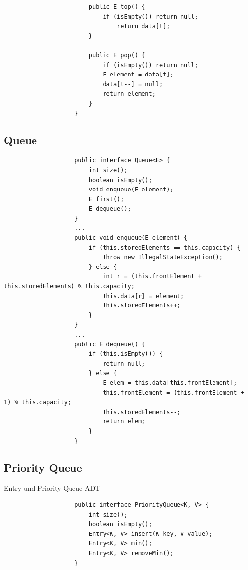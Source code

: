 \documentclass[a4paper, landscape, 8pt]{scrartcl}
\begin{document}
\begin{multicols*}{4}
\begin{lstlisting}
                        public E top() {
                            if (isEmpty()) return null;
                                return data[t];
                        }

                        public E pop() {
                            if (isEmpty()) return null;
                            E element = data[t];
                            data[t--] = null;
                            return element;
                        }
                    }
            \end{lstlisting}

            \subsection{Queue}
                \begin{lstlisting}
                    public interface Queue<E> {
                        int size();
                        boolean isEmpty();
                        void enqueue(E element);
                        E first();
                        E dequeue();
                    }
                    ...
                    public void enqueue(E element) {
                        if (this.storedElements == this.capacity) {
                            throw new IllegalStateException();
                        } else {
                            int r = (this.frontElement + this.storedElements) % this.capacity;
                            this.data[r] = element;
                            this.storedElements++;
                        }
                    }
                    ...
                    public E dequeue() {
                        if (this.isEmpty()) {
                            return null;
                        } else {
                            E elem = this.data[this.frontElement];
                            this.frontElement = (this.frontElement + 1) % this.capacity;
                            this.storedElements--;
                            return elem;
                        }
                    }
                \end{lstlisting}


            \subsection{Priority Queue}
                \textcolor{subsectioncolor}{Entry und Priority Queue ADT}
                \begin{lstlisting}
                    public interface PriorityQueue<K, V> {
                        int size();
                        boolean isEmpty();
                        Entry<K, V> insert(K key, V value);
                        Entry<K, V> min();
                        Entry<K, V> removeMin();
                    }


\end{lstlisting}
\end{multicols*}
\end{document}
